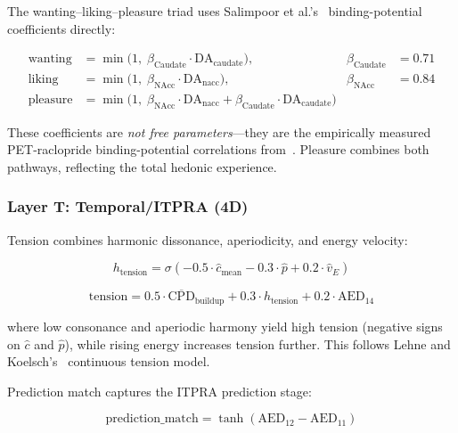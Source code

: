 \documentclass[10pt,twocolumn]{article}
\newcommand{\sigmoid}{\sigma}
\begin{document}
The wanting--liking--pleasure triad uses Salimpoor et al.'s~\cite{Salimpoor2011} binding-potential coefficients directly:

\begin{align}
\text{wanting} &= \min\!\big(1,\; \beta_\text{Caudate} \cdot \text{DA}_\text{caudate}\big), &\beta_\text{Caudate} &= 0.71 \label{eq:wanting} \\
\text{liking}  &= \min\!\big(1,\; \beta_\text{NAcc} \cdot \text{DA}_\text{nacc}\big), &\beta_\text{NAcc} &= 0.84 \label{eq:liking} \\
\text{pleasure} &= \min\!\big(1,\; \beta_\text{NAcc} \cdot \text{DA}_\text{nacc} + \beta_\text{Caudate} \cdot \text{DA}_\text{caudate}\big) \label{eq:pleasure}
\end{align}

\noindent These coefficients are \textit{not free parameters}---they are the empirically measured PET-raclopride binding-potential correlations from~\cite{Salimpoor2011}. Pleasure combines both pathways, reflecting the total hedonic experience.

\subsubsection{Layer T: Temporal/ITPRA (4D)}

Tension combines harmonic dissonance, aperiodicity, and energy velocity:

\begin{equation}
h_\text{tension} = \sigmoid\!\left(-0.5 \cdot \hat{c}_\text{mean} - 0.3 \cdot \hat{p} + 0.2 \cdot \hat{v}_E\right)
\label{eq:harmonic_tension}
\end{equation}

\begin{equation}
\text{tension} = 0.5 \cdot \overline{\text{CPD}}_\text{buildup} + 0.3 \cdot h_\text{tension} + 0.2 \cdot \text{AED}_{14}
\label{eq:tension}
\end{equation}

\noindent where low consonance and aperiodic harmony yield high tension (negative signs on $\hat{c}$ and $\hat{p}$), while rising energy increases tension further. This follows Lehne and Koelsch's~\cite{Lehne2015} continuous tension model.

Prediction match captures the ITPRA prediction stage:

\begin{equation}
\text{prediction\_match} = \tanh\!\left(\text{AED}_{12} - \text{AED}_{11}\right)
\label{eq:pred_match}
\end{equation}
\end{document}
